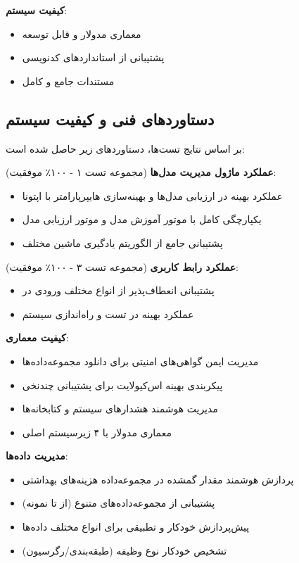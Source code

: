 \documentclass[12pt,a4paper]{article}
\begin{document}
\textbf{کیفیت سیستم}:
\begin{itemize}
\item معماری مدولار و قابل توسعه
\item پشتیبانی از استانداردهای کدنویسی
\item مستندات جامع و کامل
\end{itemize}

\subsection{دستاوردهای فنی و کیفیت سیستم}\label{subsec:achievements}

بر اساس نتایج تست‌ها، دستاوردهای زیر حاصل شده است:

{\iranfont \textbf{عملکرد ماژول مدیریت مدل‌ها}} (مجموعه تست ۱ - ۱۰۰٪ موفقیت):
\begin{itemize}
\item عملکرد بهینه در ارزیابی مدل‌ها و بهینه‌سازی هایپرپارامتر با اپتونا
\item یکپارچگی کامل با موتور آموزش مدل و موتور ارزیابی مدل
\item پشتیبانی جامع از  الگوریتم یادگیری ماشین مختلف
\end{itemize}

\textbf{عملکرد رابط کاربری} (مجموعه تست ۳ - ۱۰۰٪ موفقیت):
\begin{itemize}
\item پشتیبانی انعطاف‌پذیر از انواع مختلف ورودی در 
\item عملکرد بهینه در تست  و راه‌اندازی سیستم
\end{itemize}

\textbf{کیفیت معماری}:
\begin{itemize}
\item مدیریت ایمن گواهی‌های امنیتی برای دانلود مجموعه‌داده‌ها
\item پیکربندی بهینه اس‌کیولایت برای پشتیبانی چندنخی
\item مدیریت هوشمند هشدارهای سیستم و کتابخانه‌ها
\item معماری مدولار با ۴ زیرسیستم اصلی
\end{itemize}

\textbf{مدیریت داده‌ها}:
\begin{itemize}
\item پردازش هوشمند  مقدار گمشده در مجموعه‌داده هزینه‌های بهداشتی
\item پشتیبانی از مجموعه‌داده‌های متنوع (از  تا  نمونه)
\item پیش‌پردازش خودکار و تطبیقی برای انواع مختلف داده‌ها
\item تشخیص خودکار نوع وظیفه (طبقه‌بندی/رگرسیون)
\end{itemize}
\end{document}
